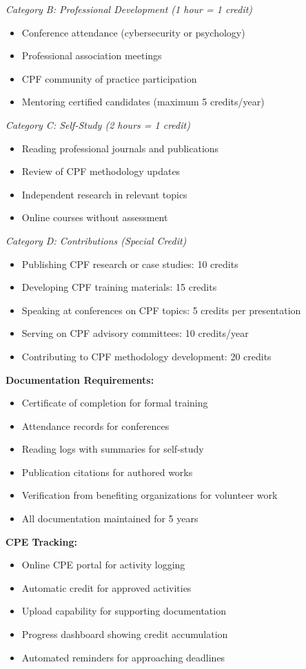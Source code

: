 \documentclass[11pt,a4paper]{article}
\begin{document}
\textit{Category B: Professional Development (1 hour = 1 credit)}
\begin{itemize}
\item Conference attendance (cybersecurity or psychology)
\item Professional association meetings
\item CPF community of practice participation
\item Mentoring certified candidates (maximum 5 credits/year)
\end{itemize}

\textit{Category C: Self-Study (2 hours = 1 credit)}
\begin{itemize}
\item Reading professional journals and publications
\item Review of CPF methodology updates
\item Independent research in relevant topics
\item Online courses without assessment
\end{itemize}

\textit{Category D: Contributions (Special Credit)}
\begin{itemize}
\item Publishing CPF research or case studies: 10 credits
\item Developing CPF training materials: 15 credits
\item Speaking at conferences on CPF topics: 5 credits per presentation
\item Serving on CPF advisory committees: 10 credits/year
\item Contributing to CPF methodology development: 20 credits
\end{itemize}

\textbf{Documentation Requirements:}
\begin{itemize}
\item Certificate of completion for formal training
\item Attendance records for conferences
\item Reading logs with summaries for self-study
\item Publication citations for authored works
\item Verification from benefiting organizations for volunteer work
\item All documentation maintained for 5 years
\end{itemize}

\textbf{CPE Tracking:}
\begin{itemize}
\item Online CPE portal for activity logging
\item Automatic credit for approved activities
\item Upload capability for supporting documentation
\item Progress dashboard showing credit accumulation
\item Automated reminders for approaching deadlines
\end{itemize}
\end{document}
